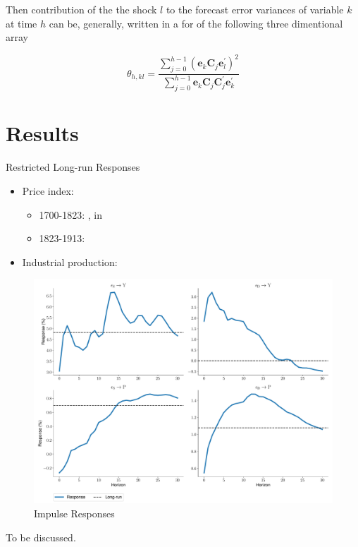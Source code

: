 \documentclass[a4paper,12pt]{article}
\begin{document}
Then contribution of the the shock \(l\) to the forecast error variances of variable \(k\) at time \(h\) can be, generally, written in a for of the following three dimentional array

\begin{equation}
		\theta_{h, k l}=\frac{\sum_{j=0}^{h-1}\left(\mathbf{e}_{k} \mathbf{C}_{j} \mathbf{e}_{l}^{\prime}\right)^{2}}{\sum_{j=0}^{h-1} \mathbf{e}_{k} \mathbf{C}_{j} \mathbf{C}_{j}^{\prime} \mathbf{e}_{k}^{\prime}}
\end{equation}

\newpage

\section{Results}

\begin{table}
\label{table:3}
\caption{Restricted Long-run Responses}
\centering

\end{table}

\begin{itemize}
\item Price index:
\begin{itemize}
\item 1700-1823: \citet{schumpeter38}, in \citet[p. 468-469]{mitchelldeane71}
\item 1823-1913: \citet[p. 863-864]{mitchelle2003}
\end{itemize}

\item Industrial production: \citet[p. 725-727]{craftsharley92}

\end{itemize}

\begin{figure}[H]
    \centering
\caption{Impulse Responses}
    \includegraphics[width=\textwidth]{../output/figures/IR.pdf} 
\end{figure}

To be discussed.

\pagebreak



\end{document}
